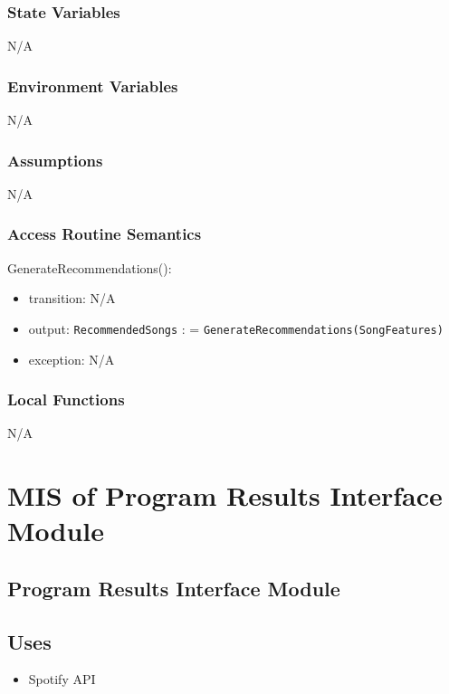\documentclass[12pt, titlepage]{article}
\begin{document}
\subsubsection{State Variables}
N/A

\subsubsection{Environment Variables}
N/A

\subsubsection{Assumptions}
N/A

\subsubsection{Access Routine Semantics}

\noindent GenerateRecommendations():
\begin{itemize}
\item transition: N/A
\item output: \texttt{Recommended\textunderscore Songs} : = \texttt{GenerateRecommendations(Song\textunderscore Features)} 
\item exception: N/A
\end{itemize}

\subsubsection{Local Functions}
N/A

\section{MIS of Program Results Interface Module} 

\subsection{Program Results Interface Module}

\subsection{Uses}
\begin{itemize}
  \item Spotify API
\end{itemize}
\end{document}
